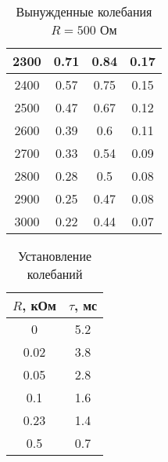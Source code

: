 \documentclass[a4paper, usenames, dvipsnames]{article}
\begin{document}
\begin{table}[p]
\begin{tabular}{|c|c|c|c|}
        \hline
        2300       & 0.71     & 0.84     & 0.17     \\
        \hline
        2400       & 0.57     & 0.75     & 0.15     \\
        \hline
        2500       & 0.47     & 0.67     & 0.12     \\
        \hline
        2600       & 0.39     & 0.6      & 0.11     \\
        \hline
        2700       & 0.33     & 0.54     & 0.09     \\
        \hline
        2800       & 0.28     & 0.5      & 0.08     \\
        \hline
        2900       & 0.25     & 0.47     & 0.08     \\
        \hline
        3000       & 0.22     & 0.44     & 0.07     \\
        \hline
    \end{tabular}
    \caption{Вынужденные колебания $R = 500$ Ом}
\end{table}

\begin{table}[p]
    \centering
    \begin{tabular}{|c|c|}
        \hline
        $R$, кОм & $\tau$, мс \\
        \hline
        0        & 5.2        \\
        \hline
        0.02     & 3.8        \\
        \hline
        0.05     & 2.8        \\
        \hline
        0.1      & 1.6        \\
        \hline
        0.23     & 1.4        \\
        \hline
        0.5      & 0.7        \\
        \hline
    \end{tabular}
    \caption{Установление колебаний}
\end{table}
\end{document}
